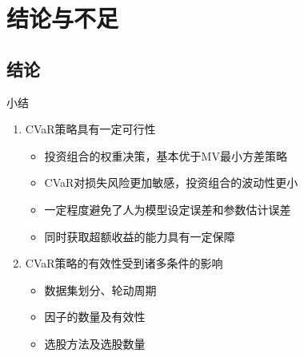 \documentclass[CJK,aspectratio=43]{beamer}  %
\begin{document}
\section{结论与不足}
\subsection{结论}
\begin{frame}{小结}
	\begin{enumerate}
	\item CVaR策略具有一定可行性
		\begin{itemize}
			\item 投资组合的权重决策，基本优于MV最小方差策略
			\item CVaR对损失风险更加敏感，投资组合的波动性更小
			\item 一定程度避免了人为模型设定误差和参数估计误差
			\item 同时获取超额收益的能力具有一定保障
		\end{itemize}
	\item CVaR策略的有效性受到诸多条件的影响
		\begin{itemize}
			\item 数据集划分、轮动周期
			\item 因子的数量及有效性
			\item 选股方法及选股数量
		\end{itemize}
	\end{enumerate}
\end{frame}
\end{document}

